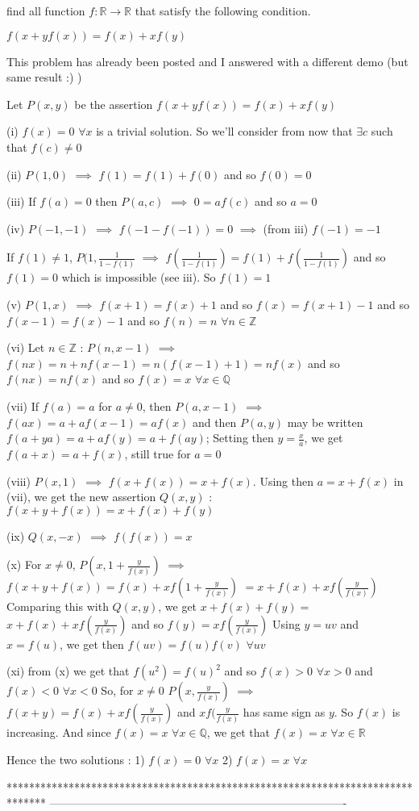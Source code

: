 \begin{solution}
	\begin{tcolorbox}find all function $ f: \mathbb R \to \mathbb R$ that satisfy the following condition.

$ f(x + yf(x)) = f(x) + xf(y)$\end{tcolorbox}

This problem has already been posted and I answered with a different demo (but same result :) )

Let $ P(x,y)$ be the assertion $ f(x+yf(x))=f(x)+xf(y)$

(i) $ f(x)=0$ $ \forall x$ is a trivial solution. So we'll consider from now that $ \exists c$ such that $ f(c)\ne 0$

(ii) $ P(1,0)$ $ \implies$ $ f(1)=f(1)+f(0)$ and so $ f(0)=0$

(iii) If $ f(a)=0$ then $ P(a,c)$ $ \implies$ $ 0=af(c)$ and so $ a=0$

(iv) $ P(-1,-1)$ $ \implies$ $ f(-1-f(-1))=0$ $ \implies$ (from iii) $ f(-1)=-1$

If $ f(1)\ne 1$, $ P(1,\frac 1{1-f(1)}$ $ \implies$ $ f(\frac 1{1-f(1)})=f(1)+f(\frac 1{1-f(1)})$ and so $ f(1)=0$ which is impossible (see iii). So $ f(1)=1$

(v) $ P(1,x)$ $ \implies$ $ f(x+1)=f(x)+1$ and so $ f(x)=f(x+1)-1$ and so $ f(x-1)=f(x)-1$ and so $ f(n)=n$ $ \forall n\in\mathbb Z$

(vi) Let $ n\in\mathbb Z$ : $ P(n,x-1)$ $ \implies$ $ f(nx)=n+nf(x-1)=n(f(x-1)+1)=nf(x)$ and so $ f(nx)=nf(x)$ and so $ f(x)=x$ $ \forall x\in\mathbb Q$

(vii) If $ f(a)=a$ for $ a\ne 0$, then $ P(a,x-1)$ $ \implies$ $ f(ax)=a+af(x-1)=af(x)$ and then $ P(a,y)$ may be written $ f(a+ya)=a+af(y)=a+f(ay)$; Setting then $ y=\frac xa$, we get $ f(a+x)=a+f(x)$, still true for $ a=0$

(viii) $ P(x,1)$ $ \implies$ $ f(x+f(x))=x+f(x)$. Using then $ a=x+f(x)$ in (vii), we get the new assertion $ Q(x,y)$ : $ f(x+y+f(x))=x+f(x)+f(y)$

(ix) $ Q(x,-x)$ $ \implies$ $ f(f(x))=x$

(x) For $ x\ne 0$, $ P(x,1+\frac y{f(x)})$ $ \implies$ $ f(x+y + f(x))=f(x)+xf(1+\frac y{f(x)})$ $ =x+f(x)+xf(\frac y{f(x)})$
Comparing this with $ Q(x,y)$, we get $ x+f(x)+f(y)=$ $ x+f(x)+xf(\frac y{f(x)})$ and so $ f(y)=xf(\frac y{f(x)})$
Using $ y=uv$ and $ x=f(u)$, we get then $ f(uv)=f(u)f(v)$ $ \forall uv$

(xi) from (x) we get that $ f(u^2)=f(u)^2$ and so $ f(x)>0$ $ \forall x>0$ and $ f(x)<0$ $ \forall x<0$
So, for $ x\ne 0$ $ P(x,\frac y{f(x)})$ $ \implies$ $ f(x+y)=f(x)+xf(\frac y{f(x)})$ and $ xf(\frac y{f(x)}$ has same sign as $ y$. So $ f(x)$ is increasing.
And since $ f(x)=x$ $ \forall x\in\mathbb Q$, we get that $ f(x)=x$ $ \forall x\in\mathbb R$

Hence the two solutions :
1) $ f(x)=0$ $ \forall x$
2) $ f(x)=x$ $ \forall x$
\end{solution}
*******************************************************************************
-------------------------------------------------------------------------------

